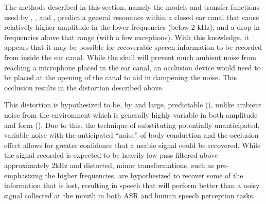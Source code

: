 \documentclass[dissertation,copyright]{uathesis}
\begin{document}



The methods described in this section, namely the models and transfer functions used by \cite{hansen:97b}, \cite{stenfelt:07}, and \cite{reinfeldt:10}, predict a general resonance within a closed ear canal that cause relatively higher amplitude in the lower frequencies (below 2 kHz), and a drop in frequencies above that range (with a few exceptions).  With this knowledge, it appears that it may be possible for recoverable speech information to be recorded from inside the ear canal.  While the skull will prevent much ambient noise from reaching a microphone placed in the ear canal, an occlusion device would need to be placed at the opening of the canal to aid in dampening the noise.  This occlusion results in the distortion described above.

This distortion is hypothesized to be, by and large, predictable (\cite{reinfeldt:10}), unlike ambient noise from the environment which is generally highly variable in both amplitude and form (\cite{zhang:17}).  Due to this, the technique of substituting potentially unanticipated, variable noise with the anticipated ``noise'' of body conduction and the occlusion effect allows for greater confidence that a usable signal could be recovered.  While the signal recorded is expected to be heavily low-pass filtered above approximately 2kHz and distorted, minor transformations, such as pre-emphasizing the higher frequencies, are hypothesized to recover some of the information that is lost, resulting in speech that will perform better than a noisy signal collected at the mouth in both ASR and human speech perception tasks.  
\end{document}
